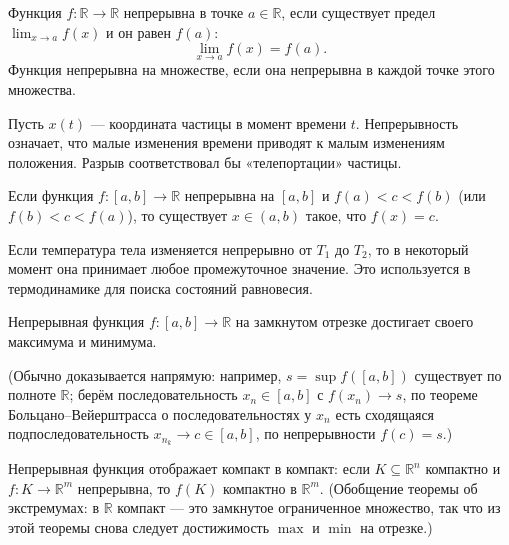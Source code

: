 \documentclass[11pt, a4paper]{extarticle}
\newcommand{\R}{{\mathbb R}}
\begin{document}
\begin{definition}
    Функция $f: \R \to \R$ непрерывна в точке $a \in \R$, если существует предел $\lim_{x \to a} f(x)$ и он равен $f(a)$:
    $$\lim_{x \to a} f(x) = f(a).$$
    Функция непрерывна на множестве, если она непрерывна в каждой точке этого множества.
    \end{definition}
    
    
\begin{example}
Пусть $x(t)$ --- координата частицы в момент времени $t$. Непрерывность означает, что малые изменения времени приводят к малым изменениям положения. Разрыв соответствовал бы «телепортации» частицы.
\end{example}


\begin{theorem}
Если функция $f: [a, b] \to \R$ непрерывна на $[a, b]$ и $f(a) < c < f(b)$ (или $f(b) < c < f(a)$), то существует $x \in (a, b)$ такое, что $f(x) = c$.
\end{theorem}

\begin{example}
Если температура тела изменяется непрерывно от $T_1$ до $T_2$, то в некоторый момент она принимает любое промежуточное значение. Это используется в термодинамике для поиска состояний равновесия.
\end{example}

\begin{theorem}
Непрерывная функция $f: [a, b] \to \R$ на замкнутом отрезке достигает своего максимума и минимума.
\end{theorem}
(Обычно доказывается напрямую: например, $s = \sup f([a,b])$ существует по полноте $\R$; берём последовательность $x_n \in [a,b]$ с $f(x_n) \to s$, по теореме Больцано--Вейерштрасса о последовательностях у $x_n$ есть сходящаяся подпоследовательность $x_{n_k} \to c \in [a,b]$, по непрерывности $f(c) = s$.)

\begin{theorem}
Непрерывная функция отображает компакт в компакт: если $K \subseteq \R^n$ компактно и $f: K \to \R^m$ непрерывна, то $f(K)$ компактно в $\R^m$. (Обобщение теоремы об экстремумах: в $\R$ компакт --- это замкнутое ограниченное множество, так что из этой теоремы снова следует достижимость $\max$ и $\min$ на отрезке.)
\end{theorem}
\end{document}
